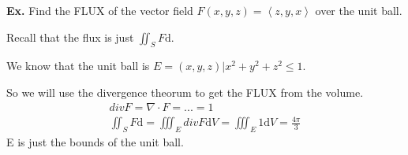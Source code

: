\documentclass[12pt,letterpaper]{article} \usepackage{amsmath} \usepackage{graphicx} \usepackage[margin=1in]{geometry} \usepackage{longtable}  \usepackage{amssymb}
\begin{document}
	\begin{mdframed}[]
	\textbf{Ex. } Find the FLUX of the vector field $F(x,y,z) = \left<z, y, x\right>$ over the unit ball. 
	
	Recall that the flux is just $\iint_S F\mathrm{d}$. 
	
	We know that the unit ball is $E = {(x,y,z) | x^2 + y^2 + z^2 \le 1}$.
	
	So we will use the divergence theorum to get the FLUX from the volume. 
	\begin{align*}
		div F = \nabla \cdot  F = ... = 1\\
		\iint_S F\mathrm{d} = \iiint_E div F \mathrm{d} V = \iiint_E 1 \mathrm d V = \frac{4\pi}{3}
	\end{align*}
	E is just the bounds of the unit ball.
	\end{mdframed} 
	
\end{document}
